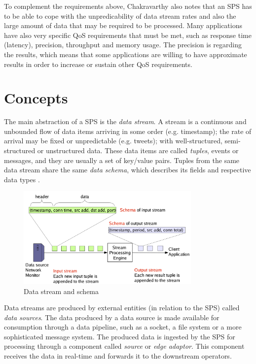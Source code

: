 \documentclass[ppgc,diss,english]{iiufrgs}
\begin{document}
To complement the requirements above, Chakravarthy \cite{chakravarthy2009stream} also notes that an SPS has to be able to cope with the unpredicability of data stream rates and also the large amount of data that may be required to be processed. Many applications have also very specific QoS requirements that must be met, such as response time (latency), precision, throughput and memory usage. The precision is regarding the results, which means that some applications are willing to have approximate results in order to increase or sustain other QoS requirements.


\section{Concepts}
\label{sec:esp:concepts}

The main abstraction of a SPS is the \emph{data stream}. A stream is a continuous and unbounded flow of data items arriving in some order (e.g. timestamp); the rate of arrival may be fixed or unpredictable (e.g. tweets); with well-structured, semi-structured or unstructured data. These data items are called \emph{tuples}, events or messages, and they are usually a set of key/value pairs. Tuples from the same data stream share the same \emph{data schema}, which describes its fields and respective data types \cite{chakravarthy2009stream}.

\begin{figure}[!ht]
	\centering
	\includegraphics[width=0.8\textwidth]{images/streams_schemas.png}
	\caption[Data stream and schema]{Data stream and schema \cite{balazinska2005fault}}
	\label{fig:sps_data_stream}
\end{figure}

Data streams are produced by external entities (in relation to the SPS) called \emph{data sources}. The data produced by a data source is made available for consumption through a data pipeline, such as a socket, a file system or a more sophisticated message system. The produced data is ingested by the SPS for processing through a component called \emph{source} or \emph{edge adaptor}. This component receives the data in real-time and forwards it to the downstream operators.
\end{document}
